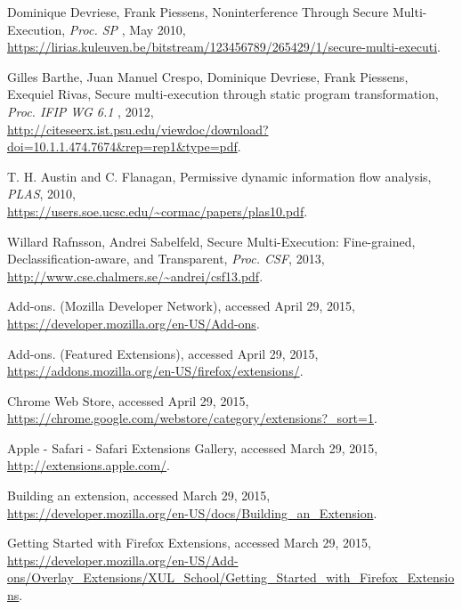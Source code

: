 \begin{thebibliography}{10}
 Dominique Devriese, Frank Piessens, Noninterference Through Secure Multi-Execution, {\it Proc. SP } , May 2010, \\
\url{https://lirias.kuleuven.be/bitstream/123456789/265429/1/secure-multi-executi}.

 Gilles Barthe, Juan Manuel Crespo, Dominique Devriese, Frank Piessens, Exequiel Rivas, Secure multi-execution through static program transformation, {\it Proc. IFIP WG 6.1 }, 2012, \\ \url{http://citeseerx.ist.psu.edu/viewdoc/download?doi=10.1.1.474.7674&rep=rep1&type=pdf}.

 T. H. Austin and C. Flanagan, Permissive dynamic information flow analysis, {\it PLAS}, 2010, \\
\url{https://users.soe.ucsc.edu/~cormac/papers/plas10.pdf}.

 Willard Rafnsson, Andrei Sabelfeld, Secure Multi-Execution: Fine-grained, Declassification-aware, and Transparent, {\it Proc. CSF}, 2013, \\
\url{http://www.cse.chalmers.se/~andrei/csf13.pdf}.

 Add-ons. (Mozilla Developer Network), accessed April 29, 2015,\\
\url{https://developer.mozilla.org/en-US/Add-ons}.

 Add-ons. (Featured Extensions), accessed April 29, 2015, \\ \url{https://addons.mozilla.org/en-US/firefox/extensions/}.

 Chrome Web Store, accessed April 29, 2015, \\
\url{https://chrome.google.com/webstore/category/extensions?_sort=1}.

 Apple - Safari - Safari Extensions Gallery, accessed March 29, 2015, \\
\url{http://extensions.apple.com/}.

 Building an extension, accessed March 29, 2015,\\ \url{https://developer.mozilla.org/en-US/docs/Building_an_Extension}.

 Getting Started with Firefox Extensions, accessed March 29, 2015, \\ \url{https://developer.mozilla.org/en-US/Add-ons/Overlay_Extensions/XUL_School/Getting_Started_with_Firefox_Extensions}.


\end{thebibliography}
